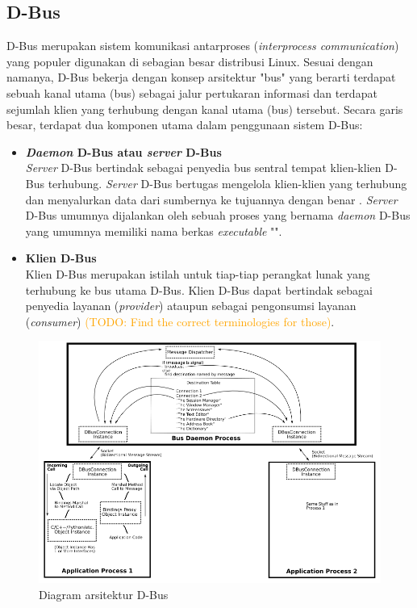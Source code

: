 
\subsection{D-Bus}

D-Bus merupakan sistem komunikasi antarproses (\textit{interprocess communication}) yang populer digunakan di sebagian besar distribusi Linux. Sesuai dengan namanya, D-Bus bekerja dengan konsep arsitektur "bus" yang berarti terdapat sebuah kanal utama (bus) sebagai jalur pertukaran informasi dan terdapat sejumlah klien yang terhubung dengan kanal utama (bus) tersebut. Secara garis besar, terdapat dua komponen utama dalam penggunaan sistem D-Bus:

\begin{itemize}
    \item \textbf{\textit{Daemon} D-Bus atau \textit{server} D-Bus}\\
    \textit{Server} D-Bus bertindak sebagai penyedia bus sentral tempat klien-klien D-Bus terhubung. \textit{Server} D-Bus bertugas mengelola klien-klien yang terhubung dan menyalurkan data dari sumbernya ke tujuannya dengan benar \cite{qt-introduction-to-dbus}. \textit{Server} D-Bus umumnya dijalankan oleh sebuah proses yang bernama \textit{daemon} D-Bus yang umumnya memiliki nama berkas \textit{executable} "".

    \item \textbf{Klien D-Bus}\\
    Klien D-Bus merupakan istilah untuk tiap-tiap perangkat lunak yang terhubung ke bus utama D-Bus. Klien D-Bus dapat bertindak sebagai penyedia layanan (\textit{provider}) ataupun sebagai pengonsumsi layanan (\textit{consumer}) \textcolor{orange}{(TODO: Find the correct terminologies for those)}.
\end{itemize}

\begin{figure}
    \centering
    \includegraphics[width=0.5\linewidth]{contents//chapter-2/dbus-diagram.png}
    \caption{Diagram arsitektur D-Bus \cite{dbus-main-project-page}}
    \label{fig:enter-label}
\end{figure}

